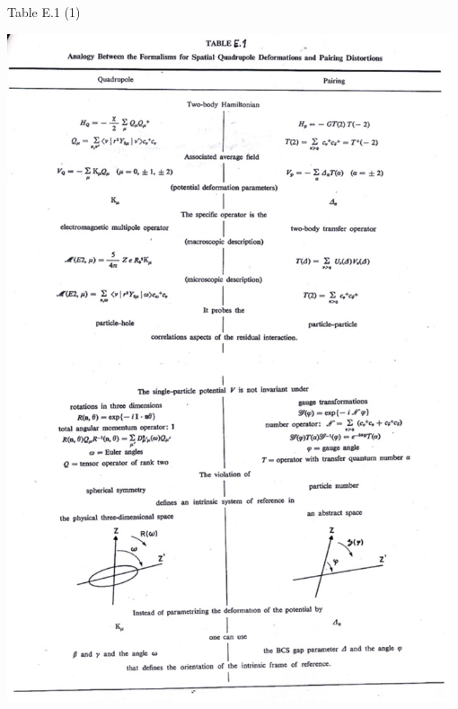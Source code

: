 \documentclass[a4paper,onecolumn,superscriptaddress,12pt,nofootinbib,twoside,raggedfooter,notitlepage]{revtex4-1}
\begin{document}
\pagebreak
Table E.1 (1)
\begin{center}
	\includegraphics[width=0.98\textwidth]{figs/tab_e1_1}
\end{center}
\end{document}
